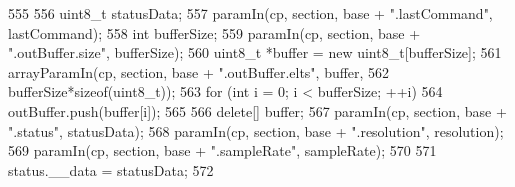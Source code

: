 \begin{DoxyCode}
555 {
556     uint8_t statusData;
557     paramIn(cp, section, base + ".lastCommand", lastCommand);
558     int bufferSize;
559     paramIn(cp, section, base + ".outBuffer.size", bufferSize);
560     uint8_t *buffer = new uint8_t[bufferSize];
561     arrayParamIn(cp, section, base + ".outBuffer.elts", buffer,
562             bufferSize*sizeof(uint8_t));
563     for (int i = 0; i < bufferSize; ++i) {
564         outBuffer.push(buffer[i]);
565     }
566     delete[] buffer;
567     paramIn(cp, section, base + ".status", statusData);
568     paramIn(cp, section, base + ".resolution", resolution);
569     paramIn(cp, section, base + ".sampleRate", sampleRate);
570 
571     status.__data = statusData;
572 }
\end{DoxyCode}


